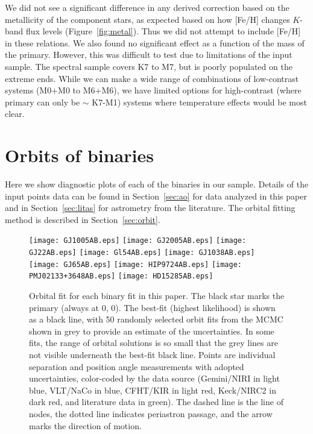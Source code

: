 \documentclass[twocolumn]{aastex62}
\begin{document}
We did not see a significant difference in any derived correction based on the metallicity of the component stars, as expected based on how [Fe/H] changes $K$-band flux levels (Figure~\ref{fig:metal}). Thus we did not attempt to include [Fe/H] in these relations. We also found no significant effect as a function of the mass of the primary. However, this was difficult to test due to limitations of the input sample. The \citet{Mann2015b} spectral sample covers K7 to M7, but is poorly populated on the extreme ends. While we can make a wide range of combinations of low-contrast systems (M0+M0 to M6+M6), we have limited options for high-contrast (where primary can only be $\sim$ K7-M1) systems where temperature effects would be most clear.

\clearpage

\section{Orbits of binaries}\label{sec:orbitplots}

Here we show diagnostic plots of each of the binaries in our sample. Details of the input points data can be found in Section~\ref{sec:ao} for data analyzed in this paper and in Section~\ref{sec:litas} for astrometry from the literature. The orbital fitting method is described in Section~\ref{sec:orbit}.

\begin{figure}[htp]
\begin{center}
\texttt{[image: GJ1005AB.eps]}
\texttt{[image: GJ2005AB.eps]}
\texttt{[image: GJ22AB.eps]}
\texttt{[image: Gl54AB.eps]}
\texttt{[image: GJ1038AB.eps]}
\texttt{[image: GJ65AB.eps]}
\texttt{[image: HIP9724AB.eps]} %
\texttt{[image: PMJ02133+3648AB.eps]} 
\texttt{[image: HD15285AB.eps]} %
\caption{Orbital fit for each binary fit in this paper. The black star marks the primary (always at 0, 0). The best-fit (highest likelihood) is shown as a black line, with 50 randomly selected orbit fits from the MCMC shown in grey to provide an estimate of the uncertainties. In some fits, the range of orbital solutions is so small that the grey lines are not visible underneath the best-fit black line. Points are individual separation and position angle measurements with adopted uncertainties, color-coded by the data source (Gemini/NIRI in light blue, VLT/NaCo in blue, CFHT/KIR in light red, Keck/NIRC2 in dark red, and literature data in green). The dashed line is the line of nodes, the dotted line indicates periastron passage, and the arrow marks the direction of motion. }
\label{fig:orbits1}
\end{center}
\end{figure}
\end{document}
